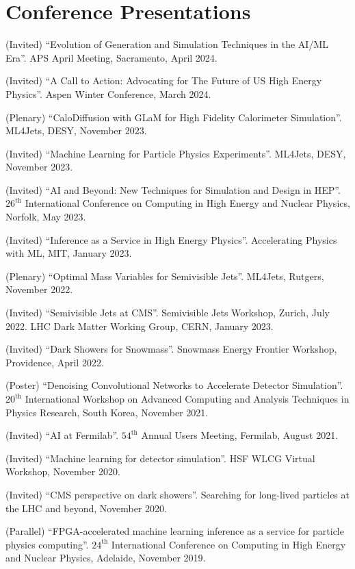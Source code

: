 \section{Conference Presentations}
\begin{description}[leftmargin=12pt,font=\normalfont,labelsep=0em]
\item (Invited) ``Evolution of Generation and Simulation Techniques in the AI/ML Era''. APS April Meeting, Sacramento, April 2024.
\item (Invited) ``A Call to Action: Advocating for The Future of US High Energy Physics''. Aspen Winter Conference, March 2024.
\item (Plenary) ``CaloDiffusion with GLaM for High Fidelity Calorimeter Simulation''. ML4Jets, DESY, November 2023.
\item (Invited) ``Machine Learning for Particle Physics Experiments''. ML4Jets, DESY, November 2023.
\item (Invited) ``AI and Beyond: New Techniques for Simulation and Design in HEP''. $26^{\text{th}}$ International Conference on Computing in High Energy and Nuclear Physics, Norfolk, May 2023.
\item (Invited) ``Inference as a Service in High Energy Physics''. Accelerating Physics with ML, MIT, January 2023.
\item (Plenary) ``Optimal Mass Variables for Semivisible Jets''. ML4Jets, Rutgers, November 2022.
\item (Invited) ``Semivisible Jets at CMS''. Semivisible Jets Workshop, Zurich, July 2022. LHC Dark Matter Working Group, CERN, January 2023.
\item (Invited) ``Dark Showers for Snowmass''. Snowmass Energy Frontier Workshop, Providence, April 2022.
\item (Poster) ``Denoising Convolutional Networks to Accelerate Detector Simulation''. $20^{\text{th}}$ International Workshop on Advanced Computing and Analysis Techniques in Physics Research, South Korea, November 2021.
\item (Invited) ``AI at Fermilab''. $54^{\text{th}}$ Annual Users Meeting, Fermilab, August 2021.
\item (Invited) ``Machine learning for detector simulation''. HSF WLCG Virtual Workshop, November 2020.
\item (Invited) ``CMS perspective on dark showers''. Searching for long-lived particles at the LHC and beyond, November 2020.
\item (Parallel) ``FPGA-accelerated machine learning inference as a service for particle physics computing''. $24^{\text{th}}$ International Conference on Computing in High Energy and Nuclear Physics, Adelaide, November 2019.

\end{description}
